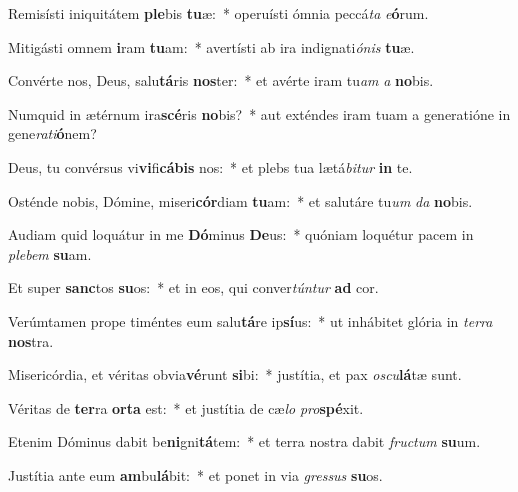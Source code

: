 \item Remisísti iniquitátem \textbf{ple}bis \textbf{tu}æ:~* operuísti ómnia peccá\textit{ta} \textit{e}\textbf{ó}rum.
\item Mitigásti omnem \textbf{i}ram \textbf{tu}am:~* avertísti ab ira indignati\textit{ó}\textit{nis} \textbf{tu}æ.
\item Convérte nos, Deus, salu\textbf{tá}ris \textbf{nos}ter:~* et avérte iram tu\textit{am} \textit{a} \textbf{no}bis.
\item Numquid in ætérnum ira\textbf{scé}ris \textbf{no}bis?~* aut exténdes iram tuam a generatióne in gene\textit{ra}\textit{ti}\textbf{ó}nem?
\item Deus, tu convérsus vi\textbf{vi}fi\textbf{cá}\textbf{bis} nos:~* et plebs tua lætá\textit{bi}\textit{tur} \textbf{in} te.
\item Osténde nobis, Dómine, miseri\textbf{cór}diam \textbf{tu}am:~* et salutáre tu\textit{um} \textit{da} \textbf{no}bis.
\item Audiam quid loquátur in me \textbf{Dó}minus \textbf{De}us:~* quóniam loquétur pacem in \textit{ple}\textit{bem} \textbf{su}am.
\item Et super \textbf{sanc}tos \textbf{su}os:~* et in eos, qui conver\textit{tún}\textit{tur} \textbf{ad} cor.
\item Verúmtamen prope timéntes eum salu\textbf{tá}re ip\textbf{sí}us:~* ut inhábitet glória in \textit{ter}\textit{ra} \textbf{nos}tra.
\item Misericórdia, et véritas obvia\textbf{vé}runt \textbf{si}bi:~* justítia, et pax \textit{os}\textit{cu}\textbf{lá}tæ sunt.
\item Véritas de \textbf{ter}ra \textbf{or}\textbf{ta} est:~* et justítia de cæ\textit{lo} \textit{pro}\textbf{spé}xit.
\item Etenim Dóminus dabit be\textbf{ni}gni\textbf{tá}tem:~* et terra nostra dabit \textit{fruc}\textit{tum} \textbf{su}um.
\item Justítia ante eum \textbf{am}bu\textbf{lá}bit:~* et ponet in via \textit{gres}\textit{sus} \textbf{su}os.
